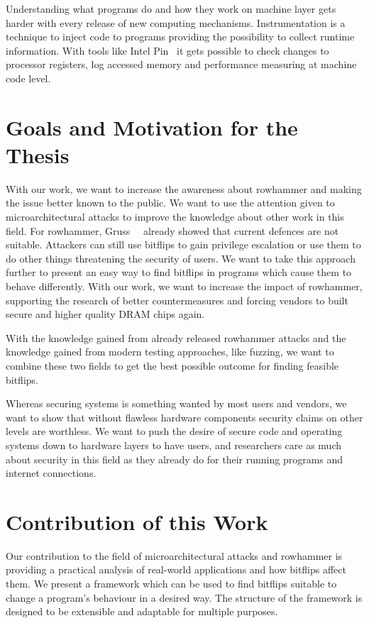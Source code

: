 Understanding what programs do and how they work on machine layer gets harder
with every release of new computing mechanisms. Instrumentation is a technique
to inject code to programs providing the possibility to collect runtime
information. With tools like Intel Pin~\cite{pintool} it gets possible to check
changes to processor registers, log accessed memory and performance measuring at
machine code level.

\section{Goals and Motivation for the Thesis}

With our work, we want to increase the awareness about rowhammer and making the
issue better known to the public. We want to use the attention given to
microarchitectural attacks to improve the knowledge about other work in this
field. For rowhammer, Gruss~\etal~\cite{flipinthewall} already showed that
current defences are not suitable. Attackers can still use bitflips to gain
privilege escalation or use them to do other things threatening the security of
users. We want to take this approach further to present an easy way to find
bitflips in programs which cause them to behave differently. With our work, we
want to increase the impact of rowhammer, supporting the research of better
countermeasures and forcing vendors to built secure and higher quality DRAM
chips again.

With the knowledge gained from already released rowhammer attacks and the
knowledge gained from modern testing approaches, like fuzzing, we want to
combine these two fields to get the best possible outcome for finding feasible
bitflips.

Whereas securing systems is something wanted by most users and vendors, we want
to show that without flawless hardware components security claims on other
levels are worthless. We want to push the desire of secure code and operating
systems down to hardware layers to have users, and researchers care as much
about security in this field as they already do for their running programs and
internet connections.

\section{Contribution of this Work}

Our contribution to the field of microarchitectural attacks and rowhammer is
providing a practical analysis of real-world applications and how bitflips
affect them. We present a framework which can be used to find bitflips suitable
to change a program's behaviour in a desired way. The structure of the framework
is designed to be extensible and adaptable for multiple purposes.

